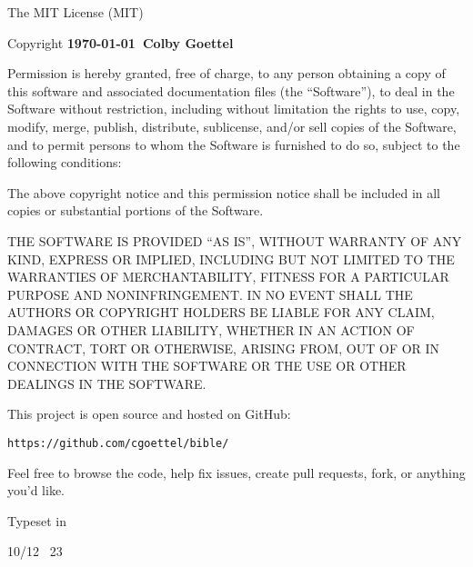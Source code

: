 {\small
    \vfil

    {\noindent The MIT License (MIT)}

    {\noindent Copyright \textbf{\textcopyright\thinspace\justtheyear\today\ Colby Goettel}}

    Permission is hereby granted, free of charge, to any person obtaining a copy of this software and associated documentation files (the ``Software''), to deal in the Software without restriction, including without limitation the rights to use, copy, modify, merge, publish, distribute, sublicense, and/or sell copies of the Software, and to permit persons to whom the Software is furnished to do so, subject to the following conditions:

    The above copyright notice and this permission notice shall be included in all copies or substantial portions of the Software.

    THE SOFTWARE IS PROVIDED ``AS IS'', WITHOUT WARRANTY OF ANY KIND, EXPRESS OR IMPLIED, INCLUDING BUT NOT LIMITED TO THE WARRANTIES OF MERCHANTABILITY, FITNESS FOR A PARTICULAR PURPOSE AND NONINFRINGEMENT. IN NO EVENT SHALL THE AUTHORS OR COPYRIGHT HOLDERS BE LIABLE FOR ANY CLAIM, DAMAGES OR OTHER LIABILITY, WHETHER IN AN ACTION OF CONTRACT, TORT OR OTHERWISE, ARISING FROM, OUT OF OR IN CONNECTION WITH THE SOFTWARE OR THE USE OR OTHER DEALINGS IN THE SOFTWARE.

    This project is open source and hosted on GitHub:
    \begin{center}
        \texttt{https://github.com/cgoettel/bible/}
    \end{center}
    Feel free to browse the code, help fix issues, create pull requests, fork, or anything you'd like.

    \vfil

    Typeset in \XeTeX

    10/12 \texttimes\ 23
}
